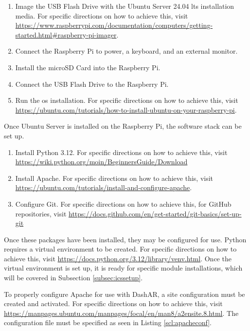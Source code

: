             \begin{enumerate}
                \item Image the USB Flash Drive with the Ubuntu Server 24.04 \gls{lts} installation media. For specific directions on how to achieve this, visit \url{https://www.raspberrypi.com/documentation/computers/getting-started.html#raspberry-pi-imager}.
                \item Connect the Raspberry Pi to power, a keyboard, and an external monitor.
                \item Install the microSD Card into the Raspberry Pi.
                \item Connect the USB Flash Drive to the Raspberry Pi.
                \item Run the \gls{os} installation. For specific directions on how to achieve this, visit \url{https://ubuntu.com/tutorials/how-to-install-ubuntu-on-your-raspberry-pi}.
            \end{enumerate}

            \par Once Ubuntu Server is installed on the Raspberry Pi, the software stack can be set up.

            \begin{enumerate}
                \item Install Python 3.12. For specific directions on how to achieve this, visit \url{https://wiki.python.org/moin/BeginnersGuide/Download}
                \item Install Apache. For specific directions on how to achieve this, visit \url{https://ubuntu.com/tutorials/install-and-configure-apache}.
                \item Configure Git. For specific directions on how to achieve this, for GitHub repositories, visit \url{https://docs.github.com/en/get-started/git-basics/set-up-git}
            \end{enumerate}

            \par Once these packages have been installed, they may be configured for use. Python requires a virtual environment to be created. For specific directions on how to achieve this, visit \url{https://docs.python.org/3.12/library/venv.html}. Once the virtual environment is set up, it is ready for specific module installations, which will be covered in Subsection \ref{subsec:icssetup}.

            \par To properly configure Apache for use with DashAR, a site configuration must be created and activated. For specific directions on how to achieve this, visit \url{https://manpages.ubuntu.com/manpages/focal/en/man8/a2ensite.8.html}. The configuration file must be specified as seen in Listing \ref{scl:apacheconf}.

